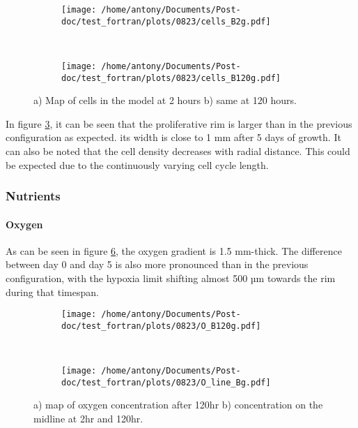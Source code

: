 \documentclass[11pt,a4paper]{article}
\begin{document}
\begin{figure}[ht!]
	\begin{subfigure}{0.5\textwidth}
	\centering
	\texttt{[image: /home/antony/Documents/Post-doc/test\_fortran/plots/0823/cells\_B2g.pdf]}
	\caption{ \label{cellsB2}}
	\end{subfigure}
	~~
	\begin{subfigure}{0.5\textwidth}
	\texttt{[image: /home/antony/Documents/Post-doc/test\_fortran/plots/0823/cells\_B120g.pdf]}
		\caption{ \label{cellB120}}
	\end{subfigure}
	\caption{a) Map of cells in the model at 2 hours b) same at 120 hours.\label{cellsB}}
	\end{figure}

In figure \ref{cellsB}, it can be seen that the proliferative rim is larger than in the previous configuration as expected. its width is close to 1 mm after 5 days of growth. It can also be noted that the cell density decreases with radial distance. This could be expected due to the continuously varying cell cycle length.\\

\subsubsection{Nutrients}

\paragraph{Oxygen}
As can be seen in figure \ref{O_B}, the oxygen gradient is 1.5 mm-thick. The difference between day 0 and day 5 is also more pronounced than in the previous configuration, with the hypoxia limit shifting almost 500 µm towards the rim during that timespan. \\ 

\begin{figure}[ht!]
	\begin{subfigure}{0.5\textwidth}
	\centering
	\texttt{[image: /home/antony/Documents/Post-doc/test\_fortran/plots/0823/O\_B120g.pdf]}
	\caption{ \label{O_B120}}
	\end{subfigure}
	~~
	\begin{subfigure}{0.4\textwidth}
	\texttt{[image: /home/antony/Documents/Post-doc/test\_fortran/plots/0823/O\_line\_Bg.pdf]}
		\caption{ \label{O_line_B}}
	\end{subfigure}
	\caption{a) map of oxygen concentration after 120hr b) concentration on the midline at 2hr and 120hr.\label{O_B}}
	\end{figure}
		
\end{document}
